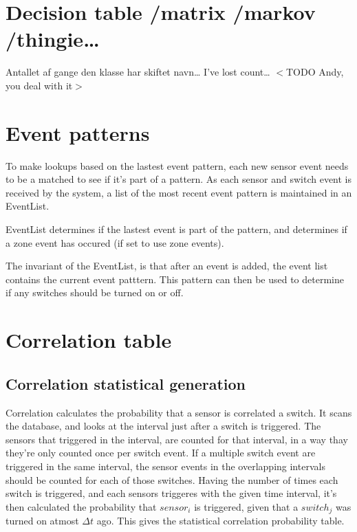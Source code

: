 \section{Decision table \slash  matrix \slash  markov \slash  thingie{\ldots}}
\label{decisiontablematrixmarkovthingie}

Antallet af gange den klasse har skiftet navn{\ldots} I've lost count{\ldots}
$<$TODO Andy, you deal with it$>$

\section{Event patterns}
\label{eventpatterns}

To make lookups based on the lastest event pattern, each new sensor event needs to be a matched to see if it's part of a pattern.
As each sensor and switch event is received by the system, a list of the most recent event pattern is maintained in an EventList. 

EventList determines if the lastest event is part of the pattern, and determines if a zone event has occured (if set to use zone events). 

The invariant of the EventList, is that after an event is added, the event list contains the current event patttern. This pattern can then be used to determine if any switches should be turned on or off.

\section{Correlation table}
\label{correlationtable}

\subsection{Correlation statistical generation}
\label{correlationstatisticalgeneration}

Correlation calculates the probability that a sensor is correlated a switch. It scans the database, and looks at the interval just after a switch is triggered. The sensors that triggered in the interval, are counted for that interval, in a way thay they're only counted once per switch event. If a multiple switch event are triggered in the same interval, the sensor events in the overlapping intervals should be counted for each of those switches. Having the number of times each switch is triggered, and each sensors triggeres with the given time interval, it's then calculated the probability that $ sensor_i $ is triggered, given that a $ switch_j $ was turned on atmost $ \Delta t $ ago. This gives the statistical correlation probability table. 

